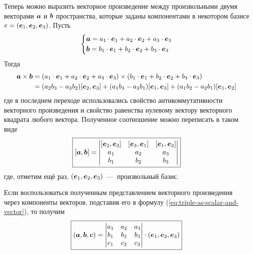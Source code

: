 \documentclass[a4paper,12pt]{article}
\begin{document}
  Теперь можно выразить векторное произведение между произвольными двумя векторами $\boldsymbol a$ и $\boldsymbol b$ пространства, которые заданы компонентами в некотором базисе $e \hm= (\bds e_1, \bds e_2, \bds e_3)$.
  Пусть
  \[
    \left\{
      \begin{aligned}
        &\boldsymbol a = a_1 \cdot \boldsymbol e_1 + a_2 \cdot \boldsymbol e_2 + a_3 \cdot \boldsymbol e_3\\
        &\boldsymbol b = b_1 \cdot \boldsymbol e_1 + b_2 \cdot \boldsymbol e_2 + b_3 \cdot \boldsymbol e_3
      \end{aligned}
    \right.
  \]
  Тогда
  \begin{equation*}
  \begin{split}
    \boldsymbol a \times \boldsymbol b
    =\; &(a_1 \cdot \boldsymbol e_1 + a_2 \cdot \boldsymbol e_2 + a_3 \cdot \boldsymbol e_3) \times (b_1 \cdot \boldsymbol e_1 + b_2 \cdot \boldsymbol e_2 + b_3 \cdot \boldsymbol e_3)\\
    =\; &(a_2 b_3 - a_3 b_2)[\boldsymbol e_2, \boldsymbol e_3] + (a_1 b_3 - a_3 b_1)[\boldsymbol e_1, \boldsymbol e_3] + (a_1 b_2 - a_2 b_1)[\boldsymbol e_1, \boldsymbol e_2]
  \end{split}
  \end{equation*}
  где в последнем переходе использовались свойство антикоммутативности векторного произведения и свойство равенства нулевому вектору векторного квадрата любого вектора.
  Полученное соотношение можно переписать в таком виде
  \begin{equation}
    \boxed{[\boldsymbol a, \boldsymbol b] = \begin{vmatrix}
      [\boldsymbol e_2, \boldsymbol e_3] & [\boldsymbol e_3, \boldsymbol e_1] & [\boldsymbol e_1, \boldsymbol e_2]\\
      a_1 & a_2 & a_3\\
      b_1 & b_2 & b_3
    \end{vmatrix}}
  \end{equation}
  где, отметим ещё раз, $(\boldsymbol e_1, \boldsymbol e_2, \boldsymbol e_3)$~---~произвольный базис.
  
  Если воспользоваться полученным представлением векторного произведения через компоненты векторов, подставив его в формулу (\ref{eq:triple-as-scalar-and-vector}), то получим
  \begin{equation}
    \boxed{(\boldsymbol a, \boldsymbol b, \boldsymbol c) = \begin{vmatrix}
      a_1 & a_2 & a_3\\
      b_1 & b_2 & b_3\\
      c_1 & c_2 & c_3
    \end{vmatrix} \cdot (\boldsymbol e_1, \boldsymbol e_2, \boldsymbol e_3)}
  \end{equation}
\end{document}
